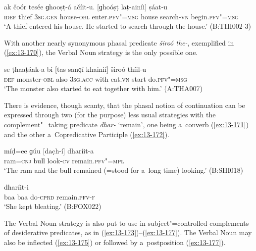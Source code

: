 \begin{exe}
\ex
\label{ex:13-169}
\gll ak čoór tesée ɡhooṣṭ-á ačíit-u. [ɡhoóṣṭ  laṭ-ainíi] ṣáat-u \\
\textsc{idef} thief \textsc{3sg.gen} house-\textsc{obl} enter.\textsc{pfv"=msg} house search-\textsc{vn} begin.\textsc{pfv"=msg} \\
\glt `A thief entered his house. He started to search through the house.' (B:THI002-3) 
\end{exe}

With another nearly synonymous phasal predicate \textit{široó the-}, exemplified in (\ref{ex:13-170}), the Verbal Noun strategy is the only possible one.

\begin{exe}
\ex
\label{ex:13-170}
\gll se ṭhaaṭáak-a bi [tas sanɡí khainií]  široó thíil-u \\
\textsc{def} monster-\textsc{obl} also \textsc{3sg.acc} with eat.\textsc{vn} start do.\textsc{pfv"=msg} \\
\glt `The monster also started to eat together with him.' (A:THA007) 
\end{exe}

There is evidence, though scanty, that the phasal notion of continuation can be expressed through two (for the purpose) less usual strategies with the complement"=taking predicate \textit{dhar-} `remain', one being a~converb (\ref{ex:13-171}) and the other a~Copredicative Participle (\ref{ex:13-172}).

\begin{exe}
\ex
\label{ex:13-171}
\gll míḍ=ee ɡúu [dac̣h-í] dharíit-a \\
ram=\textsc{cnj} bull look-\textsc{cv} remain.\textsc{pfv"=mpl} \\
\glt `The ram and the bull remained (=stood for a~long time) looking.' (B:SHI018)

\ex
\label{ex:13-172}
 dharíit-i  \\
baa baa do-\textsc{cprd} remain.\textsc{pfv-f} \\
\glt `She kept bleating.' (B:FOX022) 
\end{exe}

 The Verbal Noun strategy is also put to use in
subject"=controlled complements of desiderative predicates, as in
(\ref{ex:13-173})--(\ref{ex:13-177}). The Verbal Noun may also be inflected
(\ref{ex:13-175}) or followed by
a~postposition (\ref{ex:13-177}).

